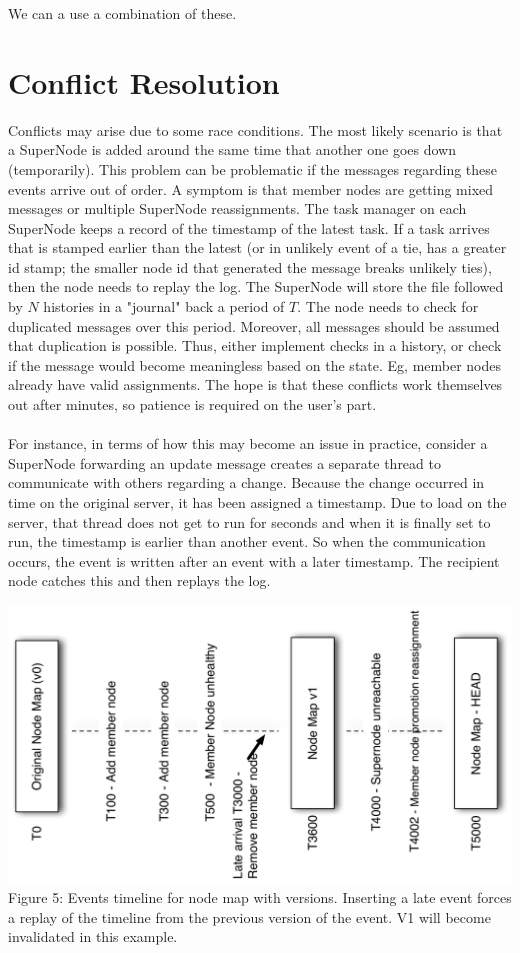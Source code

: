 \documentclass[oneside,12pt]{memoir}
\begin{document}
We can a use a combination of these.

\section{Conflict Resolution}

Conflicts may arise due to some race conditions.  The most likely scenario is that a SuperNode is added around the same time that another one goes down (temporarily).    This problem can be problematic if the messages regarding these events arrive out of order.  A symptom is that member nodes are getting mixed messages or multiple SuperNode reassignments.  
  The task manager on each SuperNode keeps a record of the timestamp of the latest task.  If a task arrives that is stamped earlier than the latest (or in unlikely event of a tie, has a greater id stamp; the smaller node id that generated the message breaks unlikely ties), then the node needs to replay the log. 
  The SuperNode will store the file followed by $N$ histories in a "journal" back a period of $T$.  
    The node needs to check for duplicated messages over this period.  Moreover, all messages should be assumed that duplication is possible.  Thus, either implement checks in a history, or check if the message would become meaningless based on the state.  Eg, member nodes already have valid assignments.   The hope is that these conflicts work themselves out after minutes, so patience is required on the user's part. \\
    \\
   For instance, in terms of how this may become an issue in practice, consider a SuperNode forwarding an update message creates a separate thread to communicate with others regarding a change.  Because the change occurred in time on the original server, it has been assigned a timestamp.  Due to load on the server, that thread does not get to run for seconds and when it is finally set to run, the timestamp is earlier than another event.  So when the communication occurs, the event is written after an event with a later timestamp.  The recipient node catches this and then replays the log.   \\
 
    
\begin{center}
\includegraphics[width=\textwidth]{presentation/timeline.pdf}
Figure 5: Events timeline for node map with versions.  Inserting a late event forces a replay of the timeline from the previous version of the event.  V1 will become invalidated in this example. 
\end{center}
\end{document}
